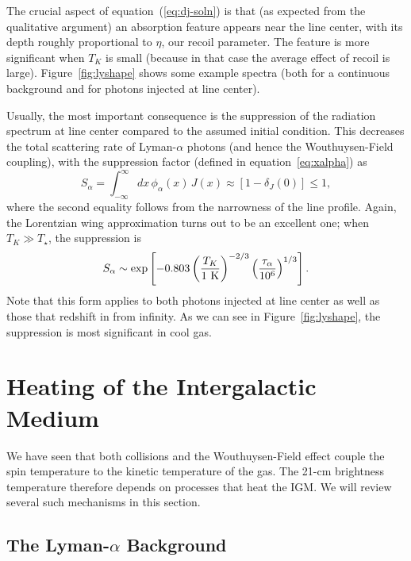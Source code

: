 The crucial aspect of equation~(\ref{eq:dj-soln}) is that (as expected from the qualitative argument) an absorption feature appears near the line center, with its depth roughly proportional to $\eta$, our recoil parameter.  The feature is more significant when $T_K$ is small (because in that case the average effect of recoil is large). Figure~\ref{fig:lyshape} shows some example spectra (both for a continuous background and for photons injected at line center).

Usually, the most important consequence is the suppression of the radiation spectrum at line center compared to the assumed initial condition.  This decreases the total scattering rate of Lyman-$\alpha$ photons (and hence the Wouthuysen-Field coupling), with the suppression factor (defined in equation~\ref{eq:xalpha}) as \cite{chen04} 
\begin{equation}
S_\alpha = \int_{-\infty}^\infty d x \, \phi_\alpha(x)\, J(x) \approx
[1 - \delta_J(0)] \le 1,
\label{eq:salpha-defn}
\end{equation}
where the second equality follows from the narrowness of the line profile.  Again, the Lorentzian wing approximation turns out to be an excellent one; when $T_K \gg T_\star$, the suppression is \cite{furl06-lyheat}
\begin{equation} S_\alpha \sim \exp \left[ -0.803 \left({T_K\over
1~{\rm K}}\right)^{-2/3} \left( \frac{\tau_\alpha}{10^{6}}
\right)^{1/3} \right].
\label{eq:salpha-approx}
\end{equation}
Note that this form applies to both photons injected at line center as well as those that redshift in from infinity.  As we can see in Figure~\ref{fig:lyshape}, the suppression is most significant in cool gas.


\section{Heating of the Intergalactic Medium} 

We have seen that both collisions and the Wouthuysen-Field effect couple the spin temperature to the kinetic temperature of the gas. The 21-cm brightness temperature therefore depends on processes that heat the IGM. We will review several such mechanisms in this section.

\subsection{The Lyman-$\alpha$ Background} \label{sec:ch1_lya} 

